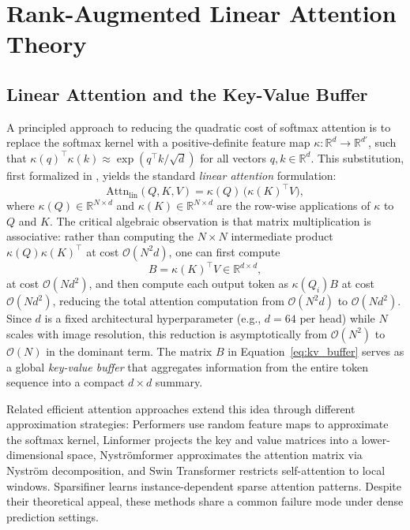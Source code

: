 \section{Rank-Augmented Linear Attention Theory}
\label{sec:rala-theory}

\subsection{Linear Attention and the Key-Value Buffer}

A principled approach to reducing the quadratic cost of softmax attention is to replace the softmax kernel with a positive-definite feature map $\kappa: \mathbb{R}^d \to \mathbb{R}^{d'}$, such that $\kappa(q)^\top \kappa(k) \approx \exp(q^\top k / \sqrt{d})$ for all vectors $q, k \in \mathbb{R}^d$. This substitution, first formalized in \cite{Katharopoulos2020Linear}, yields the standard \emph{linear attention} formulation:
\begin{equation}
\mathrm{Attn}_{\mathrm{lin}}(Q, K, V)
    = \kappa(Q)\,\bigl(\kappa(K)^\top V\bigr),
\label{eq:linear_attention}
\end{equation}
where $\kappa(Q) \in \mathbb{R}^{N \times d}$ and $\kappa(K) \in \mathbb{R}^{N \times d}$ are the row-wise applications of $\kappa$ to $Q$ and $K$. The critical algebraic observation is that matrix multiplication is associative: rather than computing the $N \times N$ intermediate product $\kappa(Q)\kappa(K)^\top$ at cost $\mathcal{O}(N^2 d)$, one can first compute
\begin{equation}
B = \kappa(K)^\top V \in \mathbb{R}^{d \times d},
\label{eq:kv_buffer}
\end{equation}
at cost $\mathcal{O}(N d^2)$, and then compute each output token as $\kappa(Q_i) B$ at cost $\mathcal{O}(N d^2)$, reducing the total attention computation from $\mathcal{O}(N^2 d)$ to $\mathcal{O}(N d^2)$. Since $d$ is a fixed architectural hyperparameter (e.g., $d = 64$ per head) while $N$ scales with image resolution, this reduction is asymptotically from $\mathcal{O}(N^2)$ to $\mathcal{O}(N)$ in the dominant term. The matrix $B$ in Equation~\ref{eq:kv_buffer} serves as a global \emph{key-value buffer} that aggregates information from the entire token sequence into a compact $d \times d$ summary.

Related efficient attention approaches extend this idea through different approximation strategies: Performers \cite{Choromanski2021Performer} use random feature maps to approximate the softmax kernel, Linformer \cite{Wang2020Linformer} projects the key and value matrices into a lower-dimensional space, Nystr\"{o}mformer \cite{Xiong2021Nystromformer} approximates the attention matrix via Nystr\"{o}m decomposition, and Swin Transformer \cite{Liu2021Swin} restricts self-attention to local windows. Sparsifiner \cite{Wei2023Sparsifiner} learns instance-dependent sparse attention patterns. Despite their theoretical appeal, these methods share a common failure mode under dense prediction settings.

